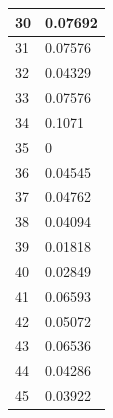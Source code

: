 \begin{tabular}{|l||l|}
	30 & 0.07692 \\ \hline
	31 & 0.07576 \\ \hline
	32 & 0.04329 \\ \hline
	33 & 0.07576 \\ \hline
	34 & 0.1071 \\ \hline
	35 & 0 \\ \hline
	36 & 0.04545 \\ \hline
	37 & 0.04762 \\ \hline
	38 & 0.04094 \\ \hline
	39 & 0.01818 \\ \hline
	40 & 0.02849 \\ \hline
	41 & 0.06593 \\ \hline
	42 & 0.05072 \\ \hline
	43 & 0.06536 \\ \hline
	44 & 0.04286 \\ \hline
	45 & 0.03922 \\ \hline
\end{tabular}
